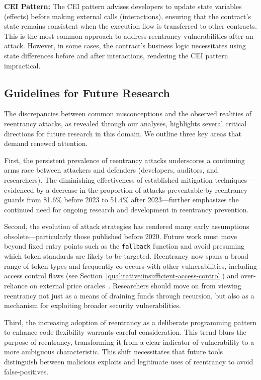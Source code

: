 \textbf{CEI Pattern:} The CEI pattern advises developers to update state variables (effects) before making external calls (interactions), ensuring that the contract's state remains consistent when the execution flow is transferred to other contracts. This is the most common approach to address reentrancy vulnerabilities after an attack. However, in some cases, the contract's business logic necessitates using state differences before and after interactions, rendering the CEI pattern impractical. 


\subsection{Guidelines for Future Research}

The discrepancies between common misconceptions and the observed realities of reentrancy attacks, as revealed through our analyses, highlights several critical directions for future research in this domain. We outline three key areas that demand renewed attention.

First, the persistent prevalence of reentrancy attacks underscores a continuing arms race between attackers and defenders (developers, auditors, and researchers). The diminishing effectiveness of established mitigation techniques—evidenced by a decrease in the proportion of attacks preventable by reentrancy guards from 81.6\% before 2023 to 51.4\% after 2023—further emphasizes the continued need for ongoing research and development in reentrancy prevention.

Second, the evolution of attack strategies has rendered many early assumptions obsolete—particularly those published before 2020. Future work must move beyond fixed entry points such as the \lstinline{fallback} function and avoid presuming which token standards are likely to be targeted. Reentrancy now spans a broad range of token types and frequently co-occurs with other vulnerabilities, including access control flaws (see Section~\ref{qualitative:insufficient-access-control}) and over-reliance on external price oracles~\cite{attack-report:marketxyz,attack-report:midas-capital,attack-report:sentiment}.  Researchers should move on from viewing reentrancy not just as a means of draining funds through recursion, but also as a mechanism for exploiting broader security vulnerabilities.

Third, the increasing adoption of reentrancy as a deliberate programming pattern to enhance code flexibility warrants careful consideration. This trend blurs the purpose of reentrancy, transforming it from a clear indicator of vulnerability to a more ambiguous characteristic. This shift necessitates that future tools distinguish between malicious exploits and legitimate uses of reentrancy to avoid false-positives.


